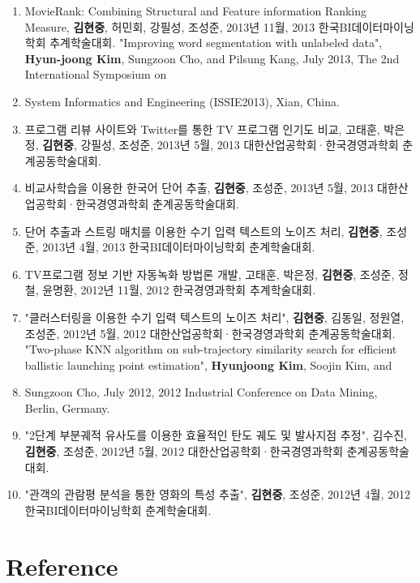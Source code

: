 \documentclass[11pt]{article}
\begin{document}
\begin{enumerate}
    \item MovieRank: Combining Structural and Feature information Ranking Measure, \textbf{김현중}, 허민회, 강필성, 조성준, 2013년 11월, 2013 한국BI데이터마이닝학회 추계학술대회.
    "Improving word segmentation with unlabeled data", \textbf{Hyun-joong Kim}, Sungzoon Cho, and Pilsung Kang, July 2013, The 2nd International Symposium on \item System Informatics and Engineering (ISSIE2013), Xian, China.
    \item 프로그램 리뷰 사이트와 Twitter를 통한 TV 프로그램 인기도 비교, 고태훈, 박은정, \textbf{김현중}, 강필성, 조성준, 2013년 5월, 2013 대한산업공학회·한국경영과학회 춘계공동학술대회.
    \item 비교사학습을 이용한 한국어 단어 추출, \textbf{김현중}, 조성준, 2013년 5월, 2013 대한산업공학회·한국경영과학회 춘계공동학술대회.
    \item 단어 추출과 스트링 매치를 이용한 수기 입력 텍스트의 노이즈 처리, \textbf{김현중}, 조성준, 2013년 4월, 2013 한국BI데이터마이닝학회 춘계학술대회.
    \item TV프로그램 정보 기반 자동녹화 방법론 개발, 고태훈, 박은정, \textbf{김현중}, 조성준, 정철, 윤명환, 2012년 11월, 2012 한국경영과학회 추계학술대회.
    \item "클러스터링을 이용한 수기 입력 텍스트의 노이즈 처리", \textbf{김현중}, 김동일, 정원열, 조성준, 2012년 5월, 2012 대한산업공학회·한국경영과학회 춘계공동학술대회.
    "Two-phase KNN algorithm on sub-trajectory similarity search for efficient ballistic launching point estimation", \textbf{Hyunjoong Kim}, Soojin Kim, and \item Sungzoon Cho, July 2012, 2012 Industrial Conference on Data Mining, Berlin, Germany.
    \item "2단계 부분궤적 유사도를 이용한 효율적인 탄도 궤도 및 발사지점 추정", 김수진, \textbf{김현중}, 조성준, 2012년 5월, 2012 대한산업공학회·한국경영과학회 춘계공동학술대회.
    \item "관객의 관람평 분석을 통한 영화의 특성 추출", \textbf{김현중}, 조성준, 2012년 4월, 2012 한국BI데이터마이닝학회 춘계학술대회.
\end{enumerate}

\section*{Reference}

\end{document}

